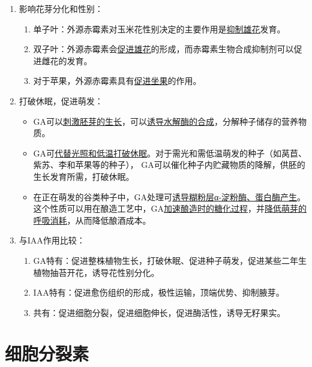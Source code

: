 \begin{enumerate}
    \item 影响花芽分化和性别：
    \begin{enumerate}
        \item 单子叶：外源赤霉素对玉米花性别决定的主要作用是\uline{抑制雄花}发育。
        \item 双子叶：外源赤霉素会\uline{促进雄花}的形成，而赤霉素生物合成抑制剂可以促进雌花的发育。
        \item 对于苹果，外源赤霉素具有\uline{促进坐果}的作用。
    \end{enumerate}
    \item 打破休眠，促进萌发：
    \begin{itemize}
        \item GA可以\uline{刺激胚芽的生长}，可以\uline{诱导水解酶的合成}，分解种子储存的营养物质。
        \item GA可\uline{代替光照和低温打破休眠}。对于需光和需低温萌发的种子（如莴苣、紫苏、李和苹果等的种子）， GA可以催化种子内贮藏物质的降解，供胚的生长发育所需，打破休眠。
        \item 在正在萌发的谷类种子中，GA处理可\uline{诱导糊粉层α-淀粉酶、蛋白酶产生}。这个性质可以用在酿造工艺中，GA\uline{加速酿造时的糖化过程}，并\uline{降低萌芽的呼吸消耗}，从而降低酿酒成本。 
    \end{itemize}
    \item 与IAA作用比较：
    \begin{enumerate}
        \item GA特有：促进整株植物生长，打破休眠、促进种子萌发，促进某些二年生植物抽苔开花，诱导花性别分化。
        \item IAA特有：促进愈伤组织的形成，极性运输，顶端优势、抑制腋芽。
        \item 共有：促进细胞分裂，促进细胞伸长，促进酶活性，诱导无籽果实。
    \end{enumerate}
\end{enumerate}

\section{细胞分裂素}
